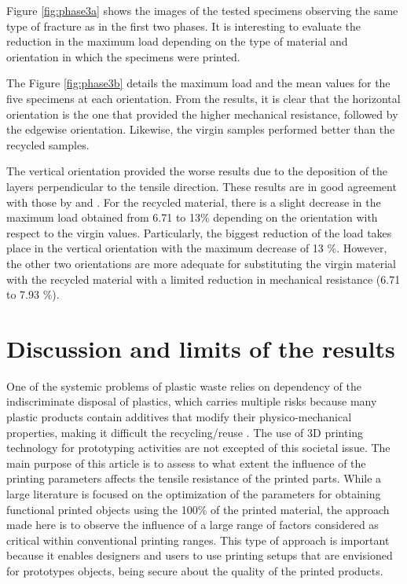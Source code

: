\documentclass[]{interact}
\theoremstyle{plain}%
\theoremstyle{definition}
\theoremstyle{remark}
\begin{document}
Figure \ref{fig:phase3a} shows the images of the tested specimens
observing the same type of fracture as in the first two phases. It is
interesting to evaluate the reduction in the maximum load depending on
the type of material and orientation in which the specimens were
printed.

The Figure \ref{fig:phase3b} details the maximum load and the mean
values for the five specimens at each orientation. From the results, it
is clear that the horizontal orientation is the one that provided the
higher mechanical resistance, followed by the edgewise orientation.
Likewise, the virgin samples performed better than the recycled samples.

The vertical orientation provided the worse results due to the
deposition of the layers perpendicular to the tensile direction. These
results are in good agreement with those by \citet{Corapi2019} and
\citet{Wang2020h}. For the recycled material, there is a slight decrease
in the maximum load obtained from 6.71 to 13\% depending on the
orientation with respect to the virgin values. Particularly, the biggest
reduction of the load takes place in the vertical orientation with the
maximum decrease of 13 \%. However, the other two orientations are more
adequate for substituting the virgin material with the recycled material
with a limited reduction in mechanical resistance (6.71 to 7.93 \%).

\hypertarget{discussion-and-limits-of-the-results}{%
\section{Discussion and limits of the
results}\label{discussion-and-limits-of-the-results}}

\label{section:discussion}

One of the systemic problems of plastic waste relies on dependency of
the indiscriminate disposal of plastics, which carries multiple risks
because many plastic products contain additives that modify their
physico-mechanical properties, making it difficult the recycling/reuse
\citep{Wagner2020}. The use of 3D printing technology for prototyping
activities are not excepted of this societal issue. The main purpose of
this article is to assess to what extent the influence of the printing
parameters affects the tensile resistance of the printed parts. While a
large literature is focused on the optimization of the parameters for
obtaining functional printed objects using the 100\% of the printed
material, the approach made here is to observe the influence of a large
range of factors considered as critical within conventional printing
ranges. This type of approach is important because it enables designers
and users to use printing setups that are envisioned for prototypes
objects, being secure about the quality of the printed products.
\end{document}
